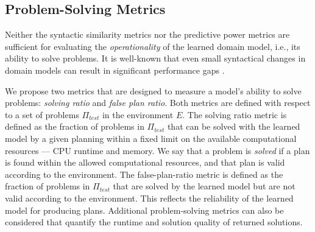 \documentclass{article}
\theoremstyle{definition}
\theoremstyle{remark}
\newcommand{\ptest}{\ensuremath{\Pi_{\textit{test}}}\xspace}
\newif\ifaddcomments
\newcommand{\roni}[1]{\ifaddcomments{\textcolor{red}{[Roni: #1]}}\fi}
\newcommand{\mauro}[1]{\ifaddcomments{\textcolor{green}{[Mauro: #1]}}\fi}
\newcommand{\gregor}[1]{\ifaddcomments{\textcolor{orange}{[Gregor: #1]}}\fi}
\begin{document}
 
\subsection{Problem-Solving Metrics}
Neither the syntactic similarity metrics nor the predictive power metrics are sufficient for evaluating the \emph{operationality} \citep{DBLP:conf/kcap/McCluskeyVV17} of the learned domain model, i.e., its ability to solve problems. It is well-known that even small syntactical changes in domain models can result in significant performance gaps \citep{DBLP:conf/kcap/VallatiC19,vallati2021importance}.

We propose two metrics that are designed to measure a model's ability to solve problems: \emph{solving ratio} and \emph{false plan ratio}. 
Both metrics are defined with respect to a set of problems \ptest in the environment $E$. 
The solving ratio metric is defined as the fraction of problems in \ptest that can be solved with the learned model by a given planning within a fixed limit on the available computational resources --- CPU runtime and memory.
We say that a problem is \emph{solved} if a plan is found within the allowed computational resources, and that plan is valid according to the environment. 
The false-plan-ratio metric is defined as the fraction of problems in \ptest that are solved by the learned model but are not valid according to the environment. This reflects the reliability of the learned model for producing plans. 
Additional problem-solving metrics can also be considered that quantify the runtime and solution quality of returned solutions. 
\end{document}
